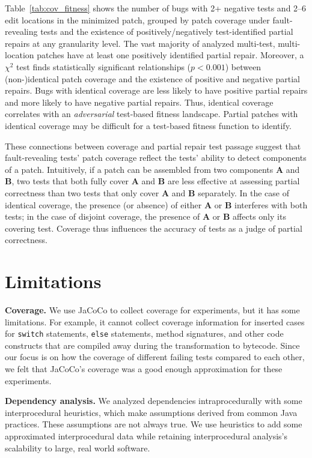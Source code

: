 \documentclass[10pt, conference]{IEEEtran}
\begin{document}
Table~\ref{tab:cov_fitness} shows the number of bugs with 2+ negative tests
and 2--6 edit locations in the minimized patch, grouped by patch coverage
under fault-revealing tests and the existence of positively/negatively test-identified
partial repairs at any granularity level.
The vast majority of analyzed multi-test, multi-location patches have at least
one positively identified partial repair.
Moreover, a $\chi^2$ test finds statistically significant relationships ($p < 0.001$)
between (non-)identical patch coverage and the existence of positive and
negative partial repairs. Bugs with identical coverage are less likely to have
positive partial repairs and more likely to have negative partial repairs.
Thus, identical coverage correlates with an
\emph{adversarial} test-based fitness landscape.
Partial patches with identical coverage may be difficult for a test-based
fitness function to identify.

These connections between coverage and partial repair test passage
suggest that fault-revealing tests' patch coverage reflect the tests' ability
to detect components of a patch.
Intuitively, if a patch can be
assembled from two components \textbf{A} and \textbf{B}, two tests that both
fully cover \textbf{A} and \textbf{B} are less effective at assessing partial
correctness than two tests that only cover \textbf{A} and \textbf{B} separately.
In the case of identical coverage, the presence (or absence) of either \textbf{A} or 
\textbf{B} interferes with both tests; in the case of disjoint coverage, the presence of 
\textbf{A} or \textbf{B} affects only its covering test.
Coverage thus influences the accuracy of tests as a judge of partial correctness.


\section{Limitations}
\label{sec:limits}

\noindent\textbf{Coverage.}
We use JaCoCo to collect coverage for experiments, but it has some
limitations. For example, it cannot collect coverage information for inserted
cases for \texttt{switch} statements, \texttt{else} statements, method
signatures, and other code constructs that are compiled away during the
transformation to bytecode. Since our focus is on how the coverage of different
failing tests compared to each other, we felt that JaCoCo's coverage was a good
enough approximation for these experiments.

\vspace{1ex}
\noindent\textbf{Dependency analysis.}
We analyzed dependencies intraprocedurally with some interprocedural 
heuristics, which make assumptions derived from common Java practices.
These assumptions are not always true. We use heuristics to add some
approximated interprocedural data while retaining interprocedural 
analysis's scalability to large, real world software.
\end{document}
